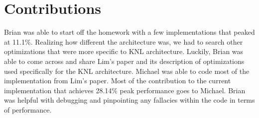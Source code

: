 \documentclass{article}
\begin{document}
\section{Contributions}
Brian was able to start off the homework with a few implementations that peaked at 11.1\%. Realizing how different the architecture was, we had to search other optimizations that were more specific to KNL architecture. Luckily, Brian was able to come across and share Lim's paper and its description of optimizations used specifically for the KNL architecture. Michael was able to code most of the implementation from Lim's paper. Most of the contribution to the current implementation that achieves 28.14\% peak performance goes to Michael. Brian was helpful with debugging and pinpointing any fallacies within the code in terms of performance.


 
\end{document}

